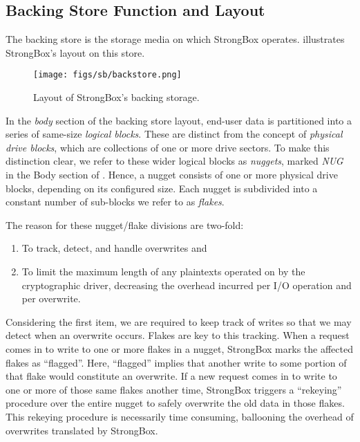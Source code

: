 \subsection{Backing Store Function and Layout}

The backing store is the storage media on which StrongBox operates.
 illustrates StrongBox's layout on this store.

\begin{figure}[t]
 \centering
  \texttt{[image: figs/sb/backstore.png]}
   \caption{Layout of StrongBox's backing storage.} \label{fig:sb-backstore}
\end{figure}

In the \textit{body} section of the backing store layout, end-user data is
partitioned into a series of same-size \emph{logical blocks}. These are distinct
from the concept of \emph{physical drive blocks}, which are collections of one
or more drive sectors. To make this distinction clear, we refer to these wider
logical blocks as \emph{nuggets}, marked \textit{NUG} in the Body section of
. Hence, a nugget consists of one or more physical drive
blocks, depending on its configured size. Each nugget is subdivided into a
constant number of sub-blocks we refer to as \emph{flakes}.

The reason for these nugget/flake divisions are two-fold:

\begin{enumerate}

\item To track, detect, and handle overwrites and

\item To limit the maximum length of any plaintexts operated on by the
cryptographic driver, decreasing the overhead incurred per I/O operation and per
overwrite.

\end{enumerate}


Considering the first item, we are required to keep track of writes so that we
may detect when an overwrite occurs. Flakes are key to this tracking. When a
request comes in to write to one or more flakes in a nugget, StrongBox marks the
affected flakes as ``flagged''. Here, ``flagged'' implies that another write to
some portion of that flake would constitute an overwrite. If a new request comes
in to write to one or more of those same flakes another time, StrongBox triggers
a ``rekeying'' procedure over the entire nugget to safely overwrite the old data
in those flakes. This rekeying procedure is necessarily time consuming,
ballooning the overhead of overwrites translated by StrongBox.

